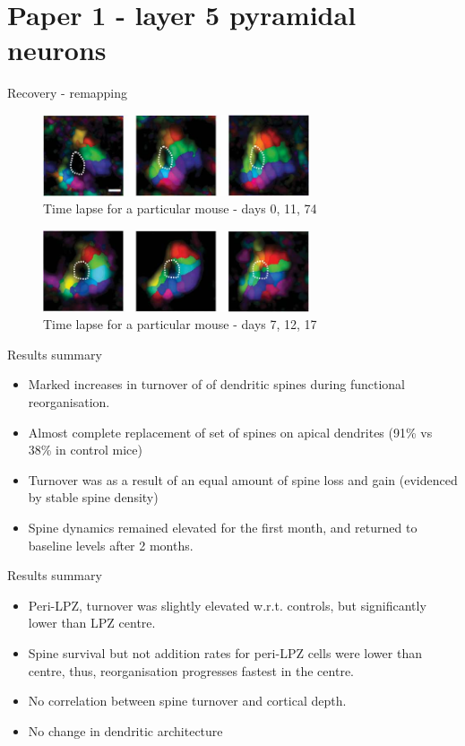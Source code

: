 \section{Paper 1 - layer 5 pyramidal neurons}
\begin{frame}{Recovery - remapping}
  \begin{figure}
    \includegraphics[keepaspectratio,width=0.7\textwidth]{99_images/keck-1-2a}
    \caption{Time lapse for a particular mouse - days 0, 11, 74}
  \end{figure}
  \begin{figure}
    \includegraphics[keepaspectratio,width=0.7\textwidth]{99_images/keck-1-2c}
    \caption{Time lapse for a particular mouse - days 7, 12, 17}
  \end{figure}
\end{frame}
\begin{frame}{Results summary}
  \begin{itemize}
    \item Marked increases in turnover of of dendritic spines during functional reorganisation.
    \item Almost complete replacement of set of spines on apical dendrites (91\% vs 38\% in control mice)
      \pause
    \item Turnover was as a result of an equal amount of spine loss and gain (evidenced by stable spine density) 
    \item Spine dynamics remained elevated for the first month, and returned to baseline levels after 2 months.
  \end{itemize}
\end{frame}
\begin{frame}{Results summary}
  \begin{itemize}
    \item Peri-LPZ, turnover was slightly elevated w.r.t. controls, but significantly lower than LPZ centre.
    \item Spine survival but not addition rates for peri-LPZ cells were lower than centre, thus, reorganisation progresses fastest in the centre.
      \pause
    \item No correlation between spine turnover and cortical depth.
    \item No change in dendritic architecture
  \end{itemize}
\end{frame}
